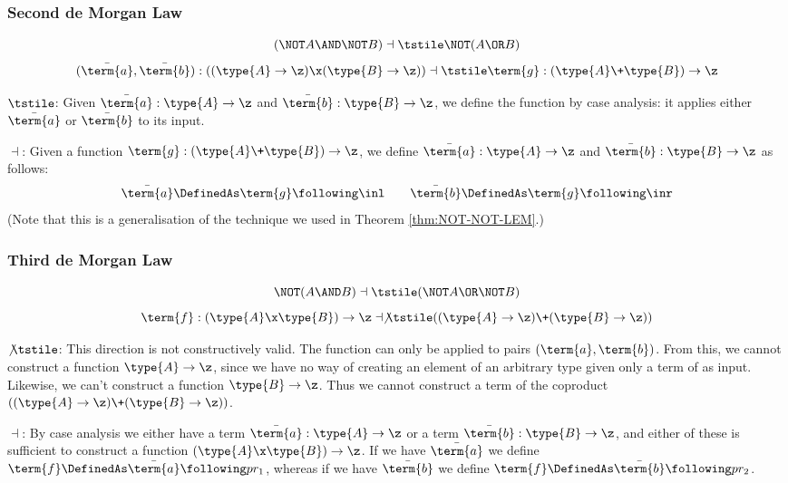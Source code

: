 \subsubsection{Second de Morgan Law}
\begin{Theorem}
\[
(\NOT A \AND \NOT B)
\dashv \tstile
\NOT(A \OR B)
\]
\[
(\bar{\term{a}}, \bar{\term{b}}):((\type{A} \to \z) \x (\type{B} \to \z))
\dashv \tstile 
\term{g}:(\type{A} \+ \type{B}) \to \z
\]\end{Theorem}
\begin{Proof}
$\tstile$: Given $\bar{\term{a}}:\type{A} \to \z$ and $\bar{\term{b}}:\type{B} \to \z$, we define the function  by case analysis: it applies either $\bar{\term{a}}$ or $\bar{\term{b}}$ to its input.

$\dashv$: Given a function $\term{g}:(\type{A} \+ \type{B}) \to \z$, we define $\bar{\term{a}}:\type{A} \to \z$ and $\bar{\term{b}}:\type{B} \to \z$ as follows:
\[
\bar{\term{a}} \DefinedAs \term{g} \following \inl \quad \quad
\bar{\term{b}} \DefinedAs \term{g} \following \inr
\]
(Note that this is a generalisation of the technique we used in Theorem \ref{thm:NOT-NOT-LEM}.)
\end{Proof}



\subsubsection{Third de Morgan Law}
\begin{Theorem}
\[
\NOT(A \AND B)
\dashv \tstile 
(\NOT A \OR \NOT B)
\]
\[
\term{f}:(\type{A} \x \type{B}) \to \z
\dashv \not\tstile 
((\type{A} \to \z) \+ (\type{B} \to \z))
\]
\end{Theorem}
\begin{Proof}
$\not\tstile$: This direction is not constructively valid.
The function  can only be applied to pairs $(\term{a}, \term{b})$.  From this, we cannot construct a function $\type{A} \to \z$, since we have no way of creating an element of an arbitrary type  given only a term of  as input.  Likewise, we can't construct a function $\type{B} \to \z$.  Thus we cannot construct a term of the coproduct
$((\type{A} \to \z) \+ (\type{B} \to \z))$.

$\dashv$: By case analysis we either have a term $\bar{\term{a}}:\type{A} \to \z$ or a term $\bar{\term{b}}:\type{B} \to \z$, and either of these is sufficient to construct a function $(\type{A} \x \type{B}) \to \z$.  
If we have $\bar{\term{a}}$ we define 
$\term{f} \DefinedAs \bar{\term{a}} \following pr_1$, 
whereas
if we have $\bar{\term{b}}$ we define 
$\term{f} \DefinedAs \bar{\term{b}} \following pr_2$.
\end{Proof}






